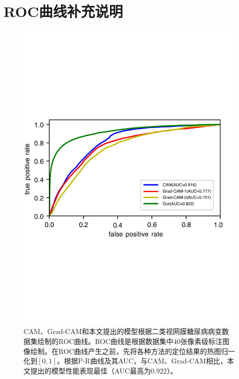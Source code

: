 \chapter{ROC曲线补充说明}\label{chapter:append1}
\begin{figure}[h]
	\centering
	\includegraphics[width=0.98\textwidth]{figure/ROC_cam_grad_cam_our_diabetic_retinopathy}
	\caption{CAM、Grad-CAM和本文提出的模型根据二类视网膜糖尿病病变数据集绘制的ROC曲线。ROC曲线是根据数据集中$40$张像素级标注图像绘制。在ROC曲线产生之前，先将各种方法的定位结果的热图归一化到$[0, 1]$。根据P-R曲线及其AUC，与CAM、Grad-CAM相比，本文提出的模型性能表现最佳（AUC最高为$0.922$）。} 
	\label{fig:roc_cam_grad_cam_our_diabetic_retinopathy}
\end{figure}
\vspace{-1cm}
